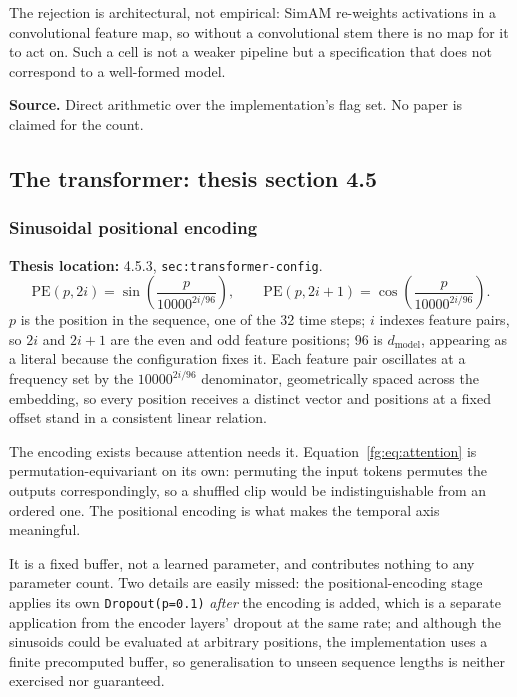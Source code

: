 \documentclass[11pt,a4paper]{article}
\numberwithin{equation}{section}
\begin{document}
The rejection is architectural, not empirical: SimAM re-weights activations in
a convolutional feature map, so without a convolutional stem there is no map
for it to act on. Such a cell is not a weaker pipeline but a specification
that does not correspond to a well-formed model.

\textbf{Source.} Direct arithmetic over the implementation's flag set. No
paper is claimed for the count.

\subsection{The transformer: thesis section 4.5}

\subsubsection{Sinusoidal positional encoding}
\label{fg:posenc}
\textbf{Thesis location:} 4.5.3, \texttt{sec:transformer-config}.
\begin{equation}
	\mathrm{PE}(p, 2i) = \sin\!\left(\frac{p}{10000^{2i/96}}\right), \qquad \mathrm{PE}(p, 2i+1) = \cos\!\left(\frac{p}{10000^{2i/96}}\right).
    \label{fg:eq:posenc}
\end{equation}
$p$ is the position in the sequence, one of the 32 time steps; $i$ indexes
feature pairs, so $2i$ and $2i+1$ are the even and odd feature positions; 96
is $d_{\text{model}}$, appearing as a literal because the configuration fixes
it. Each feature pair oscillates at a frequency set by the $10000^{2i/96}$
denominator, geometrically spaced across the embedding, so every position
receives a distinct vector and positions at a fixed offset stand in a
consistent linear relation.

The encoding exists because attention needs it. Equation~\eqref{fg:eq:attention}
is permutation-equivariant on its own: permuting the input tokens permutes the
outputs correspondingly, so a shuffled clip would be indistinguishable from an
ordered one. The positional encoding is what makes the temporal axis
meaningful.

It is a fixed buffer, not a learned parameter, and contributes nothing to any
parameter count. Two details are easily missed: the positional-encoding stage
applies its own \texttt{Dropout(p=0.1)} \emph{after} the encoding is added,
which is a separate application from the encoder layers' dropout at the same
rate; and although the sinusoids could be evaluated at arbitrary positions,
the implementation uses a finite precomputed buffer, so generalisation to
unseen sequence lengths is neither exercised nor guaranteed.
\end{document}
